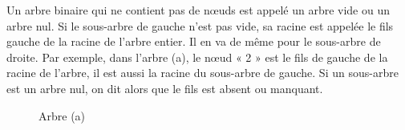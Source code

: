 \documentclass{report}
\begin{document}
Un arbre binaire qui ne contient pas de nœuds est appelé un arbre vide ou un arbre nul.
Si le sous-arbre de gauche n'est pas vide, sa racine est appelée le fils gauche de la racine de l'arbre entier. Il en va de même pour le sous-arbre de droite.
Par exemple, dans l'arbre (a), le nœud « 2 » est le fils de gauche de la racine de l'arbre, il est aussi la racine du sous-arbre de gauche.
Si un sous-arbre est un arbre nul, on dit alors que le fils est absent ou manquant.
\begin{figure}
\begin{center}
\end{center}
\caption{Arbre (a)} \label{fig:Exemples d'arbres}
\end{figure}
\end{document}
